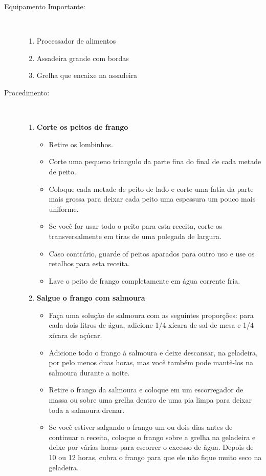 \documentclass [11pt, papel de carta] {article}
\begin{document}
\begin {description}
\item [Equipamento Importante:] \ \\
\begin {enumerate}
\item Processador de alimentos
\item Assadeira grande com bordas 
\item Grelha que encaixe na assadeira
\end {enumerate}
\item [Procedimento:] \ \\
\begin {enumerate}
\item {\bf Corte os peitos de frango}
\begin {itemize}
\item Retire os lombinhos.
\item Corte uma pequeno triangulo da parte fina do final de cada metade de peito.
\item Coloque cada metade de peito de lado e corte uma fatia da parte mais grossa para deixar cada peito uma espessura um pouco mais uniforme.
\item Se você for usar todo o peito  para esta receita, corte-os transversalmente em tiras de uma polegada de largura.
\item Caso contrário, guarde of peitos aparados para outro uso e use os retalhos para esta receita.
\item Lave o peito de frango completamente em água corrente fria.
\end {itemize}
\item {\bf Salgue o frango com salmoura}
\begin {itemize}
\item Faça uma solução de salmoura com as seguintes proporções: para cada dois litros de água, adicione 1/4 xícara de sal de mesa e 1/4 xícara de açúcar.
\item Adicione todo o frango à salmoura e deixe descansar, na geladeira, por pelo menos duas horas, mas você também pode mantê-los na salmoura durante a noite.
\item Retire o frango da salmoura e coloque em um escorregador de massa ou sobre uma grelha dentro de uma pia limpa para deixar toda a salmoura drenar.
\item Se você estiver salgando o frango um ou dois dias antes de continuar a receita, coloque o frango sobre a grelha na geladeira e deixe por várias horas para escorrer o excesso de \`agua. Depois de 10 ou 12 horas, cubra o frango para que ele não fique muito seco na geladeira.

\end{itemize}
\end{enumerate}
\end{description}
\end{document}
